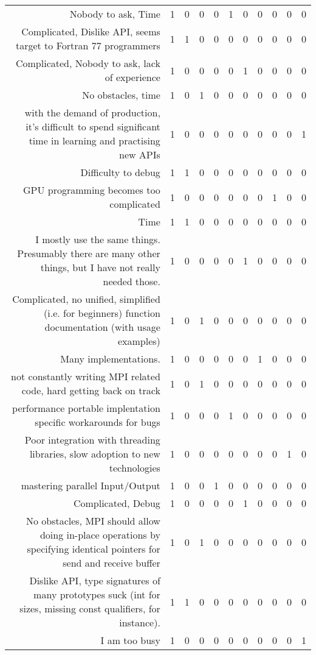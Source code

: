 {\begin{landscape}
\begin{longtable}[htb]{r|c|c|c|c|c|c|c|c|c|c}
{Nobody to ask, Time} & 1 & 0 & 0 & 0 & 1 & 0 & 0 & 0 & 0 & 0 \\%
{Complicated, Dislike API, seems target to Fortran 77 programmers} & 1 & 1 & 0 & 0 & 0 & 0 & 0 & 0 & 0 & 0 \\%
{Complicated, Nobody to ask, lack of experience} & 1 & 0 & 0 & 0 & 0 & 1 & 0 & 0 & 0 & 0 \\%
{No obstacles, time} & 1 & 0 & 1 & 0 & 0 & 0 & 0 & 0 & 0 & 0 \\%
{with the demand of production, it's difficult to spend significant time in learning and practising new APIs} & 1 & 0 & 0 & 0 & 0 & 0 & 0 & 0 & 0 & 1 \\%
{Difficulty to debug} & 1 & 1 & 0 & 0 & 0 & 0 & 0 & 0 & 0 & 0 \\%
{GPU programming becomes too complicated} & 1 & 0 & 0 & 0 & 0 & 0 & 0 & 1 & 0 & 0 \\%
{Time} & 1 & 1 & 0 & 0 & 0 & 0 & 0 & 0 & 0 & 0 \\%
{I mostly use the same things.  Presumably there are many other things, but I have not really needed those.} & 1 & 0 & 0 & 0 & 0 & 1 & 0 & 0 & 0 & 0 \\%
{Complicated, no unified, simplified (i.e. for beginners) function documentation (with usage examples)} & 1 & 0 & 1 & 0 & 0 & 0 & 0 & 0 & 0 & 0 \\%
{Many implementations.} & 1 & 0 & 0 & 0 & 0 & 0 & 1 & 0 & 0 & 0 \\%
{not constantly writing MPI related code, hard getting back on track} & 1 & 0 & 1 & 0 & 0 & 0 & 0 & 0 & 0 & 0 \\%
{performance portable  implentation specific workarounds for bugs} & 1 & 0 & 0 & 0 & 1 & 0 & 0 & 0 & 0 & 0 \\%
{Poor integration with threading libraries, slow adoption to new technologies} & 1 & 0 & 0 & 0 & 0 & 0 & 0 & 0 & 1 & 0 \\%
{mastering parallel Input/Output} & 1 & 0 & 0 & 1 & 0 & 0 & 0 & 0 & 0 & 0 \\%
{Complicated, Debug} & 1 & 0 & 0 & 0 & 0 & 1 & 0 & 0 & 0 & 0 \\%
{No obstacles, MPI should allow doing in-place operations by specifying identical pointers for send and receive buffer} & 1 & 0 & 1 & 0 & 0 & 0 & 0 & 0 & 0 & 0 \\%
{Dislike API, type signatures of many prototypes suck (int for sizes, missing const qualifiers, for instance).} & 1 & 1 & 0 & 0 & 0 & 0 & 0 & 0 & 0 & 0 \\%
{I am too busy} & 1 & 0 & 0 & 0 & 0 & 0 & 0 & 0 & 0 & 1 \\%

\end{longtable}
\end{landscape}}
